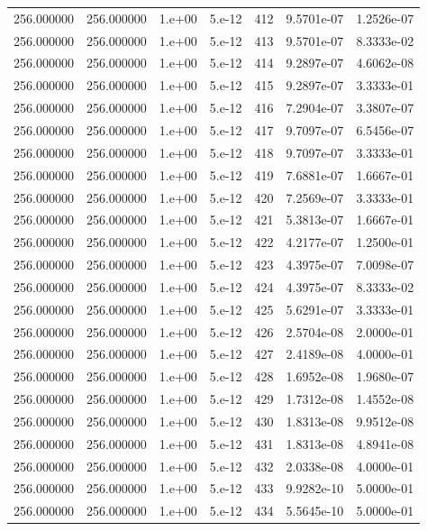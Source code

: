 \begin{table}[htbp]
\begin{tabular}{rrrrrrr}
256.000000 & 256.000000 & 1.e+00 & 5.e-12 & 412 & 9.5701e-07 & 1.2526e-07 \\
256.000000 & 256.000000 & 1.e+00 & 5.e-12 & 413 & 9.5701e-07 & 8.3333e-02 \\
256.000000 & 256.000000 & 1.e+00 & 5.e-12 & 414 & 9.2897e-07 & 4.6062e-08 \\
256.000000 & 256.000000 & 1.e+00 & 5.e-12 & 415 & 9.2897e-07 & 3.3333e-01 \\
256.000000 & 256.000000 & 1.e+00 & 5.e-12 & 416 & 7.2904e-07 & 3.3807e-07 \\
256.000000 & 256.000000 & 1.e+00 & 5.e-12 & 417 & 9.7097e-07 & 6.5456e-07 \\
256.000000 & 256.000000 & 1.e+00 & 5.e-12 & 418 & 9.7097e-07 & 3.3333e-01 \\
256.000000 & 256.000000 & 1.e+00 & 5.e-12 & 419 & 7.6881e-07 & 1.6667e-01 \\
256.000000 & 256.000000 & 1.e+00 & 5.e-12 & 420 & 7.2569e-07 & 3.3333e-01 \\
256.000000 & 256.000000 & 1.e+00 & 5.e-12 & 421 & 5.3813e-07 & 1.6667e-01 \\
256.000000 & 256.000000 & 1.e+00 & 5.e-12 & 422 & 4.2177e-07 & 1.2500e-01 \\
256.000000 & 256.000000 & 1.e+00 & 5.e-12 & 423 & 4.3975e-07 & 7.0098e-07 \\
256.000000 & 256.000000 & 1.e+00 & 5.e-12 & 424 & 4.3975e-07 & 8.3333e-02 \\
256.000000 & 256.000000 & 1.e+00 & 5.e-12 & 425 & 5.6291e-07 & 3.3333e-01 \\
256.000000 & 256.000000 & 1.e+00 & 5.e-12 & 426 & 2.5704e-08 & 2.0000e-01 \\
256.000000 & 256.000000 & 1.e+00 & 5.e-12 & 427 & 2.4189e-08 & 4.0000e-01 \\
256.000000 & 256.000000 & 1.e+00 & 5.e-12 & 428 & 1.6952e-08 & 1.9680e-07 \\
256.000000 & 256.000000 & 1.e+00 & 5.e-12 & 429 & 1.7312e-08 & 1.4552e-08 \\
256.000000 & 256.000000 & 1.e+00 & 5.e-12 & 430 & 1.8313e-08 & 9.9512e-08 \\
256.000000 & 256.000000 & 1.e+00 & 5.e-12 & 431 & 1.8313e-08 & 4.8941e-08 \\
256.000000 & 256.000000 & 1.e+00 & 5.e-12 & 432 & 2.0338e-08 & 4.0000e-01 \\
256.000000 & 256.000000 & 1.e+00 & 5.e-12 & 433 & 9.9282e-10 & 5.0000e-01 \\
256.000000 & 256.000000 & 1.e+00 & 5.e-12 & 434 & 5.5645e-10 & 5.0000e-01 \\

\end{tabular}
\end{table}
